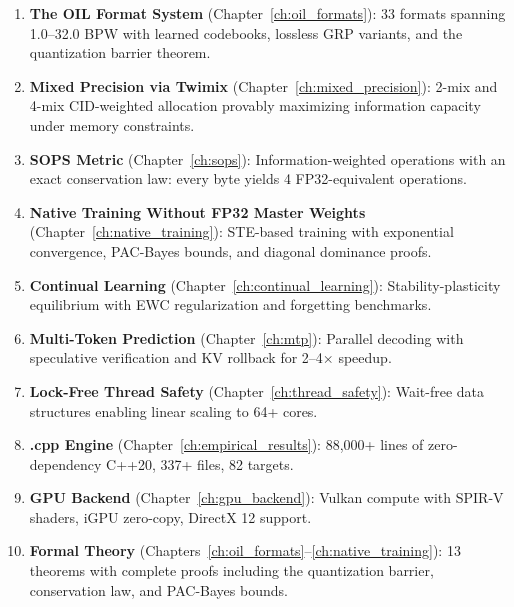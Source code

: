 \begin{enumerate}
    \item \textbf{The OIL Format System} (Chapter~\ref{ch:oil_formats}):
    33 formats spanning 1.0--32.0 BPW with learned codebooks, lossless GRP
    variants, and the quantization barrier theorem.

    \item \textbf{Mixed Precision via Twimix} (Chapter~\ref{ch:mixed_precision}):
    2-mix and 4-mix CID-weighted allocation provably maximizing information
    capacity under memory constraints.

    \item \textbf{SOPS Metric} (Chapter~\ref{ch:sops}): Information-weighted
    operations with an exact conservation law: every byte yields 4
    FP32-equivalent operations.

    \item \textbf{Native Training Without FP32 Master Weights}
    (Chapter~\ref{ch:native_training}): STE-based training with exponential
    convergence, PAC-Bayes bounds, and diagonal dominance proofs.

    \item \textbf{Continual Learning} (Chapter~\ref{ch:continual_learning}):
    Stability-plasticity equilibrium with EWC regularization and forgetting
    benchmarks.

    \item \textbf{Multi-Token Prediction} (Chapter~\ref{ch:mtp}): Parallel
    decoding with speculative verification and KV rollback for 2--4$\times$
    speedup.

    \item \textbf{Lock-Free Thread Safety} (Chapter~\ref{ch:thread_safety}):
    Wait-free data structures enabling linear scaling to 64+ cores.

    \item \textbf{\MYTHOS{}.cpp Engine} (Chapter~\ref{ch:empirical_results}):
    88{,}000+ lines of zero-dependency C++20, 337+ files, 82 targets.

    \item \textbf{GPU Backend} (Chapter~\ref{ch:gpu_backend}): Vulkan compute
    with SPIR-V shaders, iGPU zero-copy, DirectX 12 support.

    \item \textbf{Formal Theory} (Chapters~\ref{ch:oil_formats}--\ref{ch:native_training}):
    13 theorems with complete proofs including the quantization barrier,
    conservation law, and PAC-Bayes bounds.
\end{enumerate}

